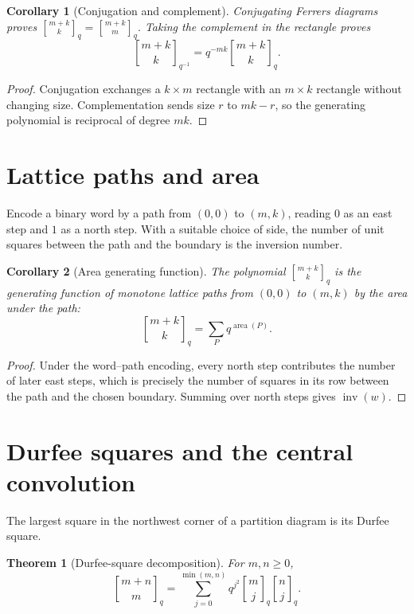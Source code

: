 \documentclass[11pt,oneside,openany]{book}
\newtheorem{theorem}{Theorem}[chapter]
\newtheorem{corollary}[corollary]{Corollary}
\theoremstyle{definition}
\theoremstyle{remark}
\newcommand{\qbinom}[2]{\genfrac{[}{]}{0pt}{}{#1}{#2}_{q}}
\newcommand{\Qbinom}[3]{\genfrac{[}{]}{0pt}{}{#1}{#2}_{#3}}
\newcommand{\inv}{\operatorname{inv}}
\newcommand{\area}{\operatorname{area}}
\begin{document}
\begin{corollary}[Conjugation and complement]\label{cor:partition-symmetries}
Conjugating Ferrers diagrams proves
\(
 \qbinom{m+k}{k}=\qbinom{m+k}{m}.
\)
Taking the complement in the rectangle proves
\[
 \Qbinom{m+k}{k}{q^{-1}}=q^{-mk}\Qbinom{m+k}{k}{q}.
\]
\end{corollary}

\begin{proof}
Conjugation exchanges a $k\times m$ rectangle with an $m\times k$ rectangle without changing size.  Complementation sends size $r$ to $mk-r$, so the generating polynomial is reciprocal of degree $mk$.
\end{proof}

\section{Lattice paths and area}

Encode a binary word by a path from $(0,0)$ to $(m,k)$, reading $0$ as an east step and $1$ as a north step.  With a suitable choice of side, the number of unit squares between the path and the boundary is the inversion number.

\begin{corollary}[Area generating function]\label{cor:path-area}
The polynomial $\Qbinom{m+k}{k}{q}$ is the generating function of monotone lattice paths from $(0,0)$ to $(m,k)$ by the area under the path:
\[
 \Qbinom{m+k}{k}{q}=\sum_P q^{\area(P)}.
\]
\end{corollary}

\begin{proof}
Under the word--path encoding, every north step contributes the number of later east steps, which is precisely the number of squares in its row between the path and the chosen boundary.  Summing over north steps gives $\inv(w)$.
\end{proof}

\section{Durfee squares and the central convolution}

The largest square in the northwest corner of a partition diagram is its Durfee square.

\begin{theorem}[Durfee-square decomposition]\label{thm:durfee-qvand}
For $m,n\ge0$,
\[
 \qbinom{m+n}{m}
 =\sum_{j=0}^{\min(m,n)}q^{j^2}\qbinom mj\qbinom nj.
\]
\end{theorem}
\end{document}
